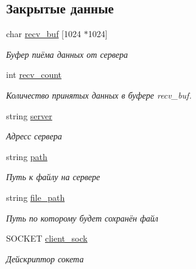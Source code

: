 \subsection*{Закрытые данные}
\begin{DoxyCompactItemize}
\item 
\mbox{\label{classHTTPClient_a2b2a7590ad11d8dc6c85f22cbf376a47}} 
char \mbox{\hyperlink{classHTTPClient_a2b2a7590ad11d8dc6c85f22cbf376a47}{recv\+\_\+buf}} \mbox{[}1024 $\ast$1024\mbox{]}
\begin{DoxyCompactList}\small\item\em Буфер пиёма данных от сервера \end{DoxyCompactList}\item 
\mbox{\label{classHTTPClient_a77963622298cf79d9939265d6382945b}} 
int \mbox{\hyperlink{classHTTPClient_a77963622298cf79d9939265d6382945b}{recv\+\_\+count}}
\begin{DoxyCompactList}\small\item\em Количество принятых данных в буфере recv\+\_\+buf. \end{DoxyCompactList}\item 
\mbox{\label{classHTTPClient_a9a8a44183458313bc880b67e3fa96bad}} 
string \mbox{\hyperlink{classHTTPClient_a9a8a44183458313bc880b67e3fa96bad}{server}}
\begin{DoxyCompactList}\small\item\em Адресс сервера \end{DoxyCompactList}\item 
\mbox{\label{classHTTPClient_a347f62a6a3a8d561838b7f578ace45a5}} 
string \mbox{\hyperlink{classHTTPClient_a347f62a6a3a8d561838b7f578ace45a5}{path}}
\begin{DoxyCompactList}\small\item\em Путь к файлу на сервере \end{DoxyCompactList}\item 
\mbox{\label{classHTTPClient_a573fb05f32d90d0ac0a7bac352ecae92}} 
string \mbox{\hyperlink{classHTTPClient_a573fb05f32d90d0ac0a7bac352ecae92}{file\+\_\+path}}
\begin{DoxyCompactList}\small\item\em Путь по которому будет сохранён файл \end{DoxyCompactList}\item 
\mbox{\label{classHTTPClient_a151a9a4e480fee2f964626721b9b819a}} 
S\+O\+C\+K\+ET \mbox{\hyperlink{classHTTPClient_a151a9a4e480fee2f964626721b9b819a}{client\+\_\+sock}}
\begin{DoxyCompactList}\small\item\em Дейскриптор сокета \end{DoxyCompactList}\end{DoxyCompactItemize}


